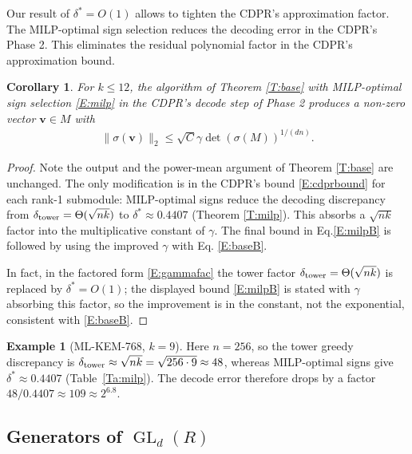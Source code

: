 \documentclass[11pt,a4paper]{article}
\theoremstyle{plain}
\newtheorem{corollary}[theorem]{Corollary}
\theoremstyle{definition}
\newtheorem{example}[theorem]{Example}
\theoremstyle{remark}
\DeclareMathOperator{\GL}{GL}
\begin{document}
Our result of $\delta^*=O(1)$ allows to tighten the CDPR's approximation factor. The MILP-optimal sign selection reduces the decoding error in the CDPR's Phase 2. This eliminates the residual polynomial factor in the CDPR's approximation bound.

\begin{corollary}\label{cor:milpmod}
  For $k\le 12$, the algorithm of Theorem \ref{T:base} with MILP-optimal sign selection \eqref{E:milp} in the CDPR's decode step of Phase 2 produces a non-zero vector $\mathbf{v}\in M$ with
\begin{align}
    \|\sigma(\mathbf{v})\|_2 \le \sqrt{C}\gamma\det(\sigma(M))^{1/(dn)}.
    \label{E:milpB}
\end{align}

\end{corollary}

\begin{proof}
Note the output and the power-mean argument of Theorem \ref{T:base} are unchanged. The only modification is in the CDPR's bound \eqref{E:cdprbound} for each rank-1 submodule: MILP-optimal signs reduce the decoding discrepancy from $\delta_{\rm tower}=\Theta(\sqrt{nk})$ to $\delta^*\approx 0.4407$ (Theorem \ref{T:milp}). This absorbs a $\sqrt{nk}$ factor into the multiplicative constant of $\gamma$. The final bound in Eq.\eqref{E:milpB} is followed by using the improved $\gamma$ with Eq. \eqref{E:baseB}.

In fact, in the factored form \eqref{E:gammafac} the tower factor $\delta_{\rm tower}=\Theta(\sqrt{nk})$ is replaced by $\delta^*=O(1)$; the displayed bound \eqref{E:milpB} is stated with $\gamma$ absorbing this factor, so the improvement is in the constant, not the exponential, consistent with \eqref{E:baseB}.
\end{proof}

\begin{example}[ML-KEM-768, $k=9$]\label{ex:milpN}
Here $n=256$, so the tower greedy discrepancy is $\delta_{\rm tower}\approx\sqrt{nk}=\sqrt{256\cdot 9}\approx 48$, whereas MILP-optimal signs give $\delta^*\approx 0.4407$ (Table~\ref{Ta:milp}). The decode error therefore drops by a factor $48/0.4407\approx 109\approx 2^{6.8}$. 
\end{example}

\subsection{Generators of $\GL_d(R)$}\label{subsec:gen}
\end{document}
